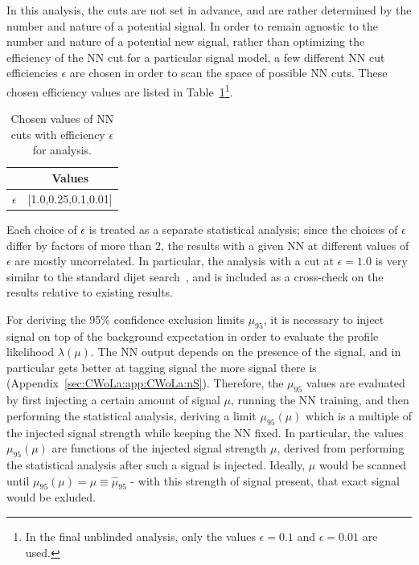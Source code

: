 In this analysis, the cuts are not set in advance, and are rather determined by the number and nature of a potential signal.
In order to remain agnostic to the number and nature of a potential new signal, rather than optimizing the efficiency of the NN cut for a particular signal model, a few different NN cut efficiencies $\epsilon$ are chosen in order to scan the space of possible NN cuts.
These chosen efficiency values are listed in Table~\ref{tab:effs}\footnote{In the final unblinded analysis, only the values $\epsilon=0.1$ and $\epsilon=0.01$ are used.}.
\begin{table}[htb]
  \centering
  \caption{Chosen values of NN cuts with efficiency $\epsilon$ for analysis.}
  \label{tab:effs}
  \begin{tabular}{c c}
    \hline
 & Values   \\ \hline
$\epsilon$ & [1.0,0.25,0.1,0.01] \\
    \hline
  \end{tabular}
\end{table}
Each choice of $\epsilon$ is treated as a separate statistical analysis; since the choices of $\epsilon$ differ by factors of more than $2$, the results with a given NN at different values of $\epsilon$ are mostly uncorrelated.
In particular, the analysis with a cut at $\epsilon=1.0$ is very similar to the standard dijet search~\cite{ATLAS:2015nsi}, and is included as a cross-check on the results relative to existing results.

For deriving the 95\% confidence exclusion limits $\mu_{95}$, it is necessary to inject signal on top of the background expectation in order to evaluate the profile likelihood $\lambda(\mu)$.
The NN output depends on the presence of the signal, and in particular gets better at tagging signal the more signal there is (Appendix~\ref{sec:CWoLa:app:CWoLa:nS}). 
Therefore, the $\mu_{95}$ values are evaluated by first injecting a certain amount of signal $\mu$, running the NN training, and then performing the statistical analysis, deriving a limit $\mu_{95}(\mu)$ which is a multiple of the injected signal strength while keeping the NN fixed. 
In particular, the values $\mu_{95}(\mu)$ are functions of the injected signal strength $\mu$, derived from performing the statistical analysis after such a signal is injected.
Ideally, $\mu$ would be scanned until $\mu_{95}(\mu)=\mu\equiv\hat{\mu}_{95}$ - with this strength of signal present, that exact signal would be exluded.

